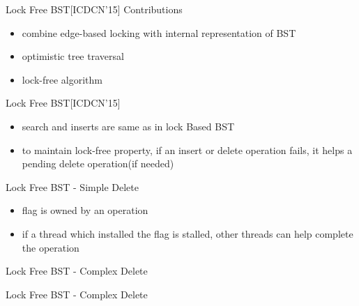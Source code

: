 \begin{frame}[c]{Lock Free BST[ICDCN'15]}
Contributions
\begin{itemize}
\item combine edge-based locking with internal representation of BST 
\item optimistic tree traversal 
\pause
\item lock-free algorithm
\end{itemize}
\end{frame}

\begin{frame}{Lock Free BST[ICDCN'15]}
\begin{itemize}
\item search and inserts are same as in lock Based BST
\item to maintain lock-free property, if an insert or delete operation fails, it helps a pending delete operation(if needed)
\end{itemize} 
\end{frame}

\begin{frame}[c]{Lock Free BST - Simple Delete}
\begin{itemize}
\item flag is owned by an operation
\item if a thread which installed the flag is stalled, other threads can help complete the operation
\end{itemize}
\pause

\end{frame}

\begin{frame}[c]{Lock Free BST - Complex Delete}

\end{frame}
\begin{frame}[c]{Lock Free BST - Complex Delete}

\end{frame}